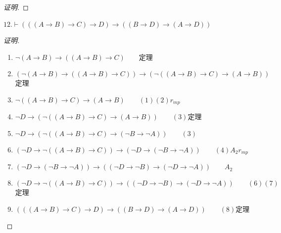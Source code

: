 \documentclass{article}
\begin{document}
\begin{CJK*}{UTF8}{gbsn}
\begin{proof}[证明]



\end{proof}

$12.\vdash (((A\to B)\to C)\to D)\to((B\to D)\to (A\to D))$
$\qquad$

\begin{proof}[证明]

  $\quad$

  \begin{enumerate}
    \item $\lnot (A\to B)\to ((A\to B)\to C)\qquad$定理
    \item $(\lnot (A\to B)\to ((A\to B)\to C))\to (\lnot ((A\to B)\to C)\to (A\to B))\qquad$定理
    \item $\lnot ((A\to B)\to C)\to (A\to B)\qquad(1)(2)r_{mp}$
    \item $\lnot D\to (\lnot ((A\to B)\to C)\to (A\to B))\qquad(3)$定理
    \item $\lnot D\to (\lnot ((A\to B)\to C)\to (\lnot B\to \lnot A))\qquad(3)$
    \item $(\lnot D\to \lnot ((A\to B)\to C))\to (\lnot D\to (\lnot B\to \lnot A))\qquad (4)A_2r_{mp}$
    \item $(\lnot D\to (\lnot B\to \lnot A))\to ((\lnot D\to \lnot B)\to (\lnot D\to \lnot A))\qquad A_2$
    \item $(\lnot D\to \lnot((A\to B)\to C)) \to ((\lnot D\to \lnot B)\to (\lnot D\to \lnot A))\qquad(6)(7)$定理
    \item $(((A\to B)\to C)\to D)\to((B\to D)\to (A\to D))\qquad (8)$定理
  \end{enumerate}
\end{proof}









\end{CJK*}
\end{document}

